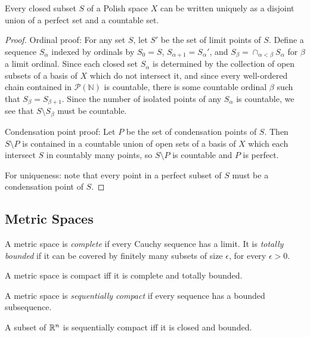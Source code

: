 \documentclass[letterpaper,11pt]{report}
\begin{document}
\begin{thm} Every closed subset $S$ of a Polish space $X$ can be written uniquely as a disjoint union of a perfect set and a countable set.
\end{thm}
\begin{proof} Ordinal proof: For any set $S$, let $S'$ be the set of limit points of $S$. Define a sequence $S_\alpha$ indexed by ordinals by $S_0 = S$, $S_{\alpha+1} = S_\alpha'$, and $S_\beta = \cap_{\alpha < \beta} S_\alpha$ for $\beta$ a limit ordinal. Since each closed set $S_\alpha$ is determined by the collection of open subsets of a basis of $X$ which do not intersect it, and since every well-ordered chain contained in $\mathcal{P}(\mathbb{N})$ is countable, there is some countable ordinal $\beta$ such that $S_\beta = S_{\beta+1}$. Since the number of isolated points of any $S_\alpha$ is countable, we see that $S\setminus S_\beta$ must be countable.

Condensation point proof: Let $P$ be the set of condensation points of $S$. Then $S\setminus P$ is contained in a countable union of open sets of a basis of $X$ which each intersect $S$ in countably many points, so $S\setminus P$ is countable and $P$ is perfect.

For uniqueness: note that every point in a perfect subset of $S$ must be a condensation point of $S$.
\end{proof}

\subsection{Metric Spaces}

\begin{defn} A metric space is \emph{complete} if every Cauchy sequence has a limit. It is \emph{totally bounded} if it can be covered by finitely many subsets of size $\epsilon$, for every $\epsilon > 0$.
\end{defn}

\begin{thm} A metric space is compact iff it is complete and totally bounded.
\end{thm}

\begin{defn} A metric space is \emph{sequentially compact} if every sequence has a bounded subsequence.
\end{defn}

\begin{thm} A subset of $\mathbb{R}^n$ is sequentially compact iff it is closed and bounded.
\end{thm}
\end{document}
